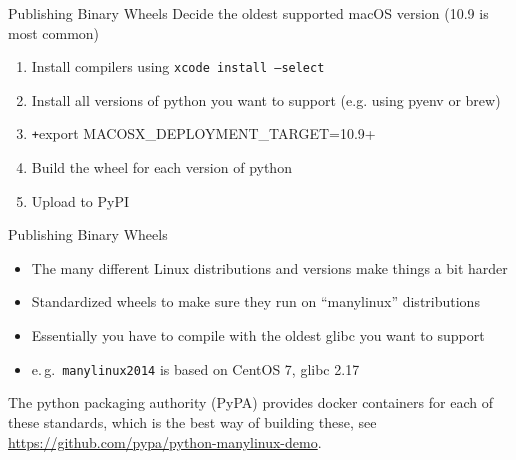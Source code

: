 \begin{frame}[c]{Publishing Binary Wheels}
  Decide the oldest supported macOS version (10.9 is most common)

  \begin{enumerate}
    \item Install compilers using \texttt{xcode install --select}
    \item Install all versions of python you want to support (e.g. using pyenv or brew)
    \item \texttt+export MACOSX_DEPLOYMENT_TARGET=10.9+
    \item Build the wheel for each version of python
    \item Upload to PyPI
  \end{enumerate}
\end{frame}

\begin{frame}[c]{Publishing Binary Wheels}
  \begin{itemize}
    \item The many different Linux distributions and versions make things a bit harder
    \item Standardized wheels to make sure they run on \enquote{manylinux} distributions
    \item Essentially you have to compile with the oldest glibc you want to support
    \item e.\,g.\ \texttt{manylinux2014} is based on CentOS 7, glibc 2.17
  \end{itemize}

  The python packaging authority (PyPA) provides docker containers for each of these standards,
  which is the best way of building these, see \url{https://github.com/pypa/python-manylinux-demo}.
\end{frame}


